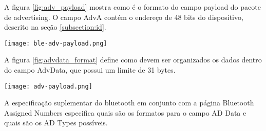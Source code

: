 A figura \ref{fig:adv_payload} mostra como é o formato do campo payload do
pacote de advertising. O campo AdvA contém o endereço de 48 bits do dispositivo,
descrito na seção \ref{subsection:id}.
\begin{center}
	\centering 
	\texttt{[image: ble-adv-payload.png]}  
	\label{fig:adv_payload}
\end{center}  

A figura \ref{fig:advdata_format} define como devem ser organizados os dados
dentro do campo AdvData, que possui um limite de 31 bytes.
\begin{center}
	\centering 
	\texttt{[image: adv-payload.png]}  
	\label{fig:advdata_format}
\end{center} 

A especificação suplementar do bluetooth em conjunto com a página Bluetooth
Assigned Numbers especifica quais são os formatos para o campo AD Data e quais
são os AD Types possíveis. \cite{ble4sup} \cite{GAPDataTypes}
